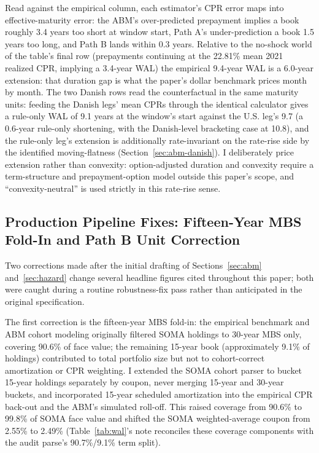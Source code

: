 \documentclass[12pt]{article}
\begin{document}
Read against the empirical column, each estimator's CPR error maps into effective-maturity error: the ABM's over-predicted prepayment implies a book roughly 3.4 years too short at window start, Path A's under-prediction a book 1.5 years too long, and Path B lands within 0.3 years. Relative to the no-shock world of the table's final row (prepayments continuing at the 22.81\% mean 2021 realized CPR, implying a 3.4-year WAL) the empirical 9.4-year WAL is a 6.0-year extension: that duration gap is what the paper's dollar benchmark prices month by month. The two Danish rows read the counterfactual in the same maturity units: feeding the Danish legs' mean CPRs through the identical calculator gives a rule-only WAL of 9.1 years at the window's start against the U.S. leg's 9.7 (a 0.6-year rule-only shortening, with the Danish-level bracketing case at 10.8), and the rule-only leg's extension is additionally rate-invariant on the rate-rise side by the identified moving-flatness (Section~\ref{sec:abm-danish}). I deliberately price extension rather than convexity: option-adjusted duration and convexity require a term-structure and prepayment-option model outside this paper's scope, and ``convexity-neutral'' is used strictly in this rate-rise sense.

\subsection{Production Pipeline Fixes: Fifteen-Year MBS Fold-In and Path B Unit Correction}\label{sec:robustness-pipeline}

Two corrections made after the initial drafting of Sections~\ref{sec:abm} and~\ref{sec:hazard} change several headline figures cited throughout this paper; both were caught during a routine robustness-fix pass rather than anticipated in the original specification.

The first correction is the fifteen-year MBS fold-in: the empirical benchmark and ABM cohort modeling originally filtered SOMA holdings to 30-year MBS only, covering 90.6\% of face value; the remaining 15-year book (approximately 9.1\% of holdings) contributed to total portfolio size but not to cohort-correct amortization or CPR weighting. I extended the SOMA cohort parser to bucket 15-year holdings separately by coupon, never merging 15-year and 30-year buckets, and incorporated 15-year scheduled amortization into the empirical CPR back-out and the ABM's simulated roll-off. This raised coverage from 90.6\% to 99.8\% of SOMA face value and shifted the SOMA weighted-average coupon from 2.55\% to 2.49\% (Table~\ref{tab:wal}'s note reconciles these coverage components with the audit parse's 90.7\%/9.1\% term split).
\end{document}
